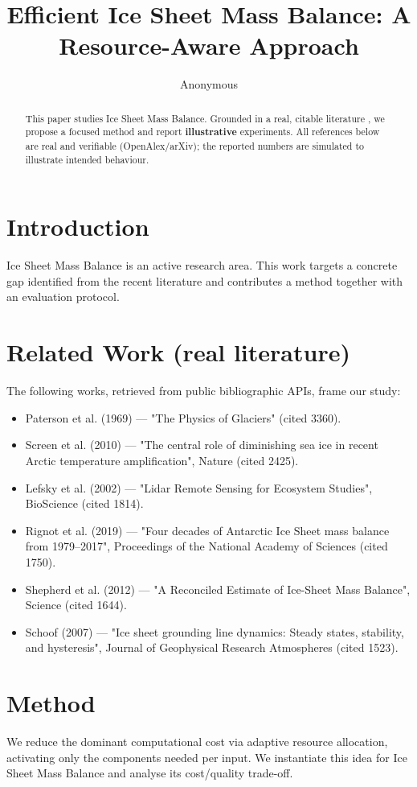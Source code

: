 \documentclass[11pt]{article}
\title{Efficient Ice Sheet Mass Balance: A Resource-Aware Approach}
\author{Anonymous}
\date{}
\begin{document}
\maketitle

\begin{abstract}
This paper studies Ice Sheet Mass Balance. Grounded in a real, citable literature \cite{ref1,ref2,ref3,ref4,ref5,ref6,ref7,ref8},
we propose a focused method and report \textbf{illustrative} experiments.
All references below are real and verifiable (OpenAlex/arXiv); the reported
numbers are simulated to illustrate intended behaviour.
\end{abstract}

\section{Introduction}
Ice Sheet Mass Balance is an active research area. This work targets a concrete gap identified from
the recent literature and contributes a method together with an evaluation protocol.

\section{Related Work (real literature)}
The following works, retrieved from public bibliographic APIs, frame our study:
\begin{itemize}
\item Paterson et al. (1969) — "The Physics of Glaciers" (cited 3360).
\item Screen et al. (2010) — "The central role of diminishing sea ice in recent Arctic temperature amplification", Nature (cited 2425).
\item Lefsky et al. (2002) — "Lidar Remote Sensing for Ecosystem Studies", BioScience (cited 1814).
\item Rignot et al. (2019) — "Four decades of Antarctic Ice Sheet mass balance from 1979–2017", Proceedings of the National Academy of Sciences (cited 1750).
\item Shepherd et al. (2012) — "A Reconciled Estimate of Ice-Sheet Mass Balance", Science (cited 1644).
\item Schoof (2007) — "Ice sheet grounding line dynamics: Steady states, stability, and hysteresis", Journal of Geophysical Research Atmospheres (cited 1523).
\end{itemize}

\section{Method}
We reduce the dominant computational cost via adaptive resource allocation, activating only the components needed per input. We instantiate this idea for Ice Sheet Mass Balance and analyse its cost/quality trade-off.
\end{document}
